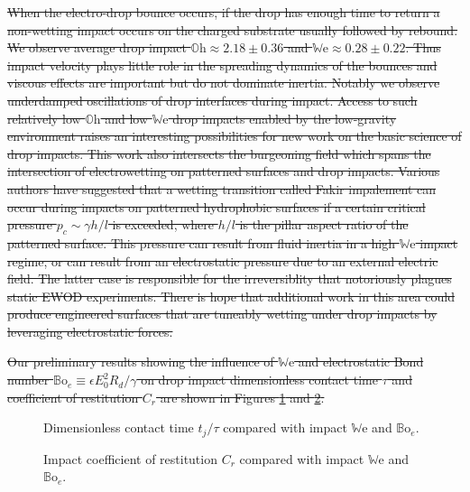 \documentclass[aip,reprint, floatfix]{revtex4-1}
\begin{document}
\sout{When the electro-drop bounce occurs, if the drop has enough time to return a non-wetting impact occurs on the charged substrate usually followed by rebound. We observe average drop impact $\mathbb{O}\mbox{h} \approx 2.18 \pm 0.36$ and  $\mathbb{W}\mbox{e} \approx 0.28 \pm 0.22$. Thus impact velocity plays little role in the spreading dynamics of the bounces and viscous effects are important but do not dominate inertia. Notably we observe underdamped oscillations of drop interfaces during impact. Access to such relatively low $\mathbb{O}\mbox{h}$ and low $\mathbb{W}\mbox{e}$ drop impacts enabled by the low-gravity environment raises an interesting possibilities for new work on the basic science of drop impacts. This work also intersects the burgeoning field which spans the intersection of electrowetting on patterned surfaces and drop impacts. Various authors \cite{bartolo_bouncing_2006, reyssat_bouncing_2006} have suggested that a wetting transition called Fakir impalement can occur during impacts on patterned hydrophobic surfaces if a certain critical pressure $p_c \sim \gamma h/l$ is exceeded, where $h/l$ is the pillar aspect ratio of the patterned surface. This pressure can result from fluid inertia in a high $\mathbb{W}\mbox{e}$ impact regime, or can result from an electrostatic pressure due to an external electric field. The latter case is responsible for the irreversiblity that notoriously plagues static EWOD experiments. There is hope that additional work in this area could produce engineered surfaces that are tuneably wetting under drop impacts by leveraging electrostatic forces.}
 
\sout{Our preliminary results showing the influence of $\mathbb{W}\mbox{e}$ and electrostatic Bond number $\mathbb{B}\mbox{o}_e \equiv \epsilon E_0^2 R_d/\gamma $ on drop impact dimensionless contact time $\tau$ and coefficient of restitution $C_r$ are shown in Figures \ref{fig:contact} and \ref{fig:restitution}.}

\begin{figure}[htb]
    \centering
    \resizebox{0.5\textwidth}{!}{}
    \caption{Dimensionless contact time $t_j/\tau$ compared with impact $\mathbb{W}\mbox{e}$ and $\mathbb{B}\mbox{o}_e$.\label{fig:contact}}
\end{figure}

\begin{figure}[htb]
    \centering
    \resizebox{0.5\textwidth}{!}{}
    \caption{Impact coefficient of restitution $C_r$ compared with impact $\mathbb{W}\mbox{e}$ and $\mathbb{B}\mbox{o}_e$.\label{fig:restitution}}
\end{figure}
\end{document}
